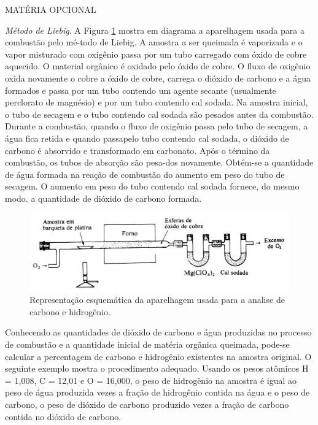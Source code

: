 \par\bigskip
\begin{leftbar}[cut=false]
\footnotesize
\noindent MATÉRIA OPCIONAL

\noindent \textit{Método de Liebig}. A Figura \ref{figurar_2_1} mostra em diagrama a aparelhagem usada para a combustão pelo mé-todo de Liebig. A amostra a ser queimada é vaporizada e o vapor misturado com oxigênio passa por um tubo carregado com óxido de cobre aquecido. O material orgânico é oxidado pelo óxido de cobre. O fluxo de oxigênio oxida novamente o cobre a óxido de cobre, carrega o dióxido de carbono e a água formados e passa por um tubo contendo um agente secante (usualmente perclorato de magnésio) e por um tubo contendo cal sodada. Na amostra inicial, o tubo de secagem e o tubo contendo cal sodada são pesados antes da combustão. Durante a combustão, quando o fluxo de oxigênio passa pelo tubo de secagem, a água fica retida e quando passapelo tubo contendo cal sodada, o dióxido de carbono é absorvido e transformado em carbonato. Após o término da combustão, os tubos de absorção são pesa-dos novamente. Obtém-se a quantidade de água formada na reação de combustão do aumento em peso do tubo de secagem. O aumento em peso do tubo contendo cal sodada fornece, do mesmo modo. a quantidade de dióxido de carbono formada.

\begin{figure}[H]
    \centering
    \captionsetup{width=0.93\linewidth}
    \includegraphics[scale=0.3]{content/images/Figura_2_1.pdf}
    \caption{Representação esquemática da aparelhagem usada para a analise de carbono e hidrogênio.}
    \label{figurar_2_1}
\end{figure}

Conhecendo as quantidades de dióxido de carbono e água produzidas no processo de combustão e a quantidade inicial de matéria orgânica queimada, pode-se calcular a percentagem de carbono e hidrogênio existentes na amostra original. O seguinte exemplo mostra o procedimento adequado. Usando os pesos atômicos H = 1,008, C = 12,01 e O = 16,000, o peso de hidrogênio na amostra é igual ao peso de água produzida vezes a fração de hidrogênio contida na água e o peso de carbono, o peso de dióxido de carbono produzido vezes a fração de carbono contida no dióxido de carbono.


\end{leftbar}
